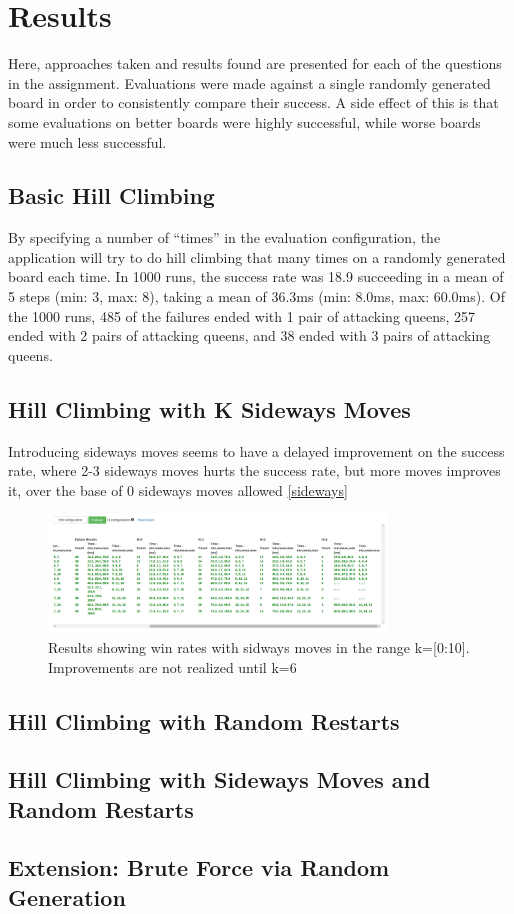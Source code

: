 \section{Results}
\label{section:results}
Here, approaches taken and results found are presented for each of the questions in the assignment. Evaluations were
made against a single randomly generated board in order to consistently compare their success. A side effect of this
is that some evaluations on better boards were highly successful, while worse boards were much less successful.

\subsection{Basic Hill Climbing}
By specifying a number of ``times'' in the evaluation configuration, the application will try to do hill climbing that
many times on a randomly generated board each time. In 1000 runs, the success rate was 18.9%
succeeding in a mean of 5 steps (min: 3, max: 8), taking a mean of 36.3ms (min: 8.0ms, max: 60.0ms). Of the 1000 runs,
485 of the failures ended with 1 pair of attacking queens, 257 ended with 2 pairs of attacking queens, and 38 ended with
3 pairs of attacking queens.

\subsection{Hill Climbing with K Sideways Moves}
Introducing sideways moves seems to have a delayed improvement on the success rate, where 2-3 sideways moves hurts the
success rate, but more moves improves it, over the base of 0 sideways moves allowed \ref{sideways}

\begin{figure}[ht!]
\centering
\includegraphics[width=90mm]{img/sideways.png}
\caption{Results showing win rates with sidways moves in the range k=[0:10]. Improvements are not realized until k=6}
\label{fig:ui}
\end{figure}


\subsection{Hill Climbing with Random Restarts}


\subsection{Hill Climbing with Sideways Moves and Random Restarts}


\subsection{Extension: Brute Force via Random Generation}

